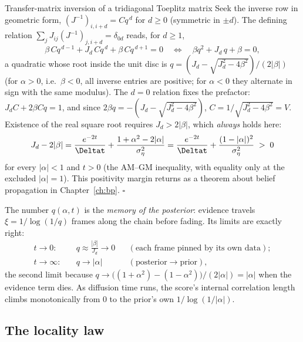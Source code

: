 \begin{toolbox}{Transfer-matrix inversion of a tridiagonal Toeplitz matrix}
Seek the inverse row in geometric form,
$(J^{-1})_{i, i+d} = C q^{\,d}$ for $d \geq 0$ (symmetric in $\pm d$). The
defining relation $\sum_j J_{ij} (J^{-1})_{j, i+d} = \delta_{0d}$ reads, for
$d \geq 1$,
\begin{equation*}
  \beta\, C q^{\,d-1} + J_d\, C q^{\,d} + \beta\, C q^{\,d+1} = 0
  \quad\Longleftrightarrow\quad
  \beta q^2 + J_d\, q + \beta = 0,
\end{equation*}
a quadratic whose root inside the unit disc is
$q = (J_d - \sqrt{J_d^2 - 4\beta^2})/(2|\beta|)$ (for $\alpha > 0$, i.e.\
$\beta < 0$, all inverse entries are positive; for $\alpha < 0$ they
alternate in sign with the same modulus). The $d = 0$ relation fixes the
prefactor: $J_d C + 2\beta C q = 1$, and since
$2\beta q = -(J_d - \sqrt{J_d^2 - 4\beta^2})$,
$C = 1/\sqrt{J_d^2 - 4\beta^2} = V$. Existence of the real square root
requires $J_d > 2|\beta|$, which \emph{always} holds here:
\begin{equation*}
  J_d - 2|\beta|
  = \frac{e^{-2t}}{\Deltat} + \frac{1 + \alpha^2 - 2|\alpha|}{\sigma_\eta^2}
  = \frac{e^{-2t}}{\Deltat} + \frac{(1 - |\alpha|)^2}{\sigma_\eta^2}
  \;>\; 0
\end{equation*}
for every $|\alpha| < 1$ and $t > 0$ (the AM--GM inequality, with equality
only at the excluded $|\alpha| = 1$). This positivity margin returns as a
theorem about belief propagation in Chapter~\ref{ch:bp}. \hfill$\square$
\end{toolbox}

The number $q(\alpha, t)$ is the \emph{memory of the posterior}: evidence
travels $\xi = 1/\log(1/q)$ frames along the chain before fading. Its limits
are exactly right:
\begin{equation}
  \begin{aligned}
  t \to 0:&\quad q \approx \frac{|\beta|}{J_d} \to 0
  &&(\text{each frame pinned by its own data});\\
  t \to \infty:&\quad q \to |\alpha|
  &&(\text{posterior} \to \text{prior}),
  \end{aligned}
  \label{eq:g-q-limits}
\end{equation}
the second limit because
$q \to \big((1+\alpha^2) - (1-\alpha^2)\big)/(2|\alpha|) = |\alpha|$ when the
evidence term dies. As diffusion time runs, the score's internal correlation
length climbs monotonically from $0$ to the prior's own
$1/\log(1/|\alpha|)$.

\subsection{The locality law}\label{sec:g-locality}

